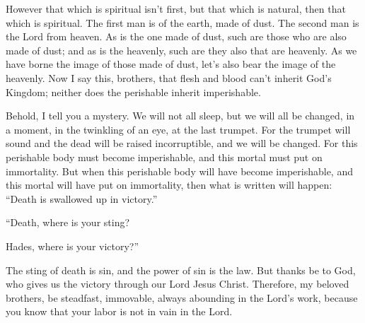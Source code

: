 {However that which is spiritual isn’t first, but that which is natural, then that which is spiritual.
The first man is of the earth, made of dust. The second man is the Lord from heaven.
As is the one made of dust, such are those who are also made of dust; and as is the heavenly, such are they also that are heavenly.
As we have borne the image of those made of dust, let’s also bear the image of the heavenly.
Now I say this, brothers, that flesh and blood can’t inherit God’s Kingdom; neither does the perishable inherit imperishable.
\par }{\PP {}Behold, I tell you a mystery. We will not all sleep, but we will all be changed,
in a moment, in the twinkling of an eye, at the last trumpet. For the trumpet will sound and the dead will be raised incorruptible, and we will be changed.
For this perishable body must become imperishable, and this mortal must put on immortality.
But when this perishable body will have become imperishable, and this mortal will have put on immortality, then what is written will happen: “Death is swallowed up in victory.”
\par }{\Q {}“Death, where is your sting?
\par }{\QB Hades, where is your victory?”
\par }{\PP {}The sting of death is sin, and the power of sin is the law.
But thanks be to God, who gives us the victory through our Lord Jesus Christ.
Therefore, my beloved brothers, be steadfast, immovable, always abounding in the Lord’s work, because you know that your labor is not in vain in the Lord.

}
